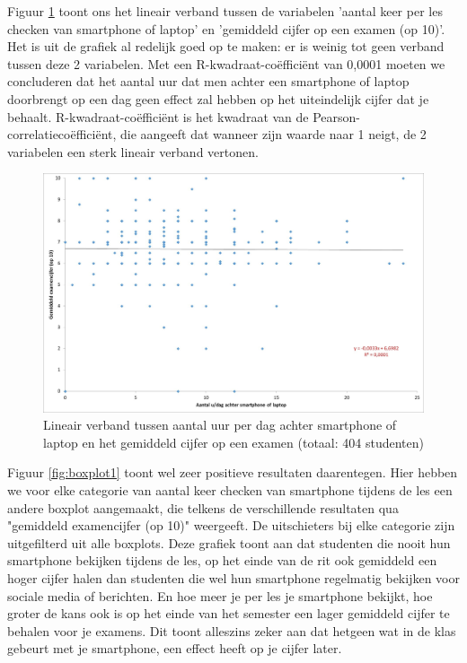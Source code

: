 Figuur \ref{fig:scatter1} toont ons het lineair verband tussen de variabelen 'aantal keer per les checken van smartphone of laptop' en 'gemiddeld cijfer op een examen (op 10)'. Het is uit de grafiek al redelijk goed op te maken: er is weinig tot geen verband tussen deze 2 variabelen. Met een R-kwadraat-coëfficiënt van 0,0001 moeten we concluderen dat het aantal uur dat men achter een smartphone of laptop doorbrengt op een dag geen effect zal hebben op het uiteindelijk cijfer dat je behaalt. R-kwadraat-coëfficiënt is het kwadraat van de Pearson-correlatiecoëfficiënt, die aangeeft dat wanneer zijn waarde naar 1 neigt, de 2 variabelen een sterk lineair verband vertonen. 

\begin{figure}
	\includegraphics[width=\textwidth]
	{img/Scatter1.jpg}
	\caption{Lineair verband tussen aantal uur per dag achter smartphone of laptop en het gemiddeld cijfer op een examen (totaal: 404 studenten)}
	\label{fig:scatter1}
\end{figure}

Figuur \ref{fig:boxplot1} toont wel zeer positieve resultaten daarentegen. Hier hebben we voor elke categorie van aantal keer checken van smartphone tijdens de les een andere boxplot aangemaakt, die telkens de verschillende resultaten qua "gemiddeld examencijfer (op 10)" weergeeft. De uitschieters bij elke categorie zijn uitgefilterd uit alle boxplots. Deze grafiek toont aan dat studenten die nooit hun smartphone bekijken tijdens de les, op het einde van de rit ook gemiddeld een hoger cijfer halen dan studenten die wel hun smartphone regelmatig bekijken voor sociale media of berichten. En hoe meer je per les je smartphone bekijkt, hoe groter de kans ook is op het einde van het semester een lager gemiddeld cijfer te behalen voor je examens. Dit toont alleszins zeker aan dat hetgeen wat in de klas gebeurt met je smartphone, een effect heeft op je cijfer later.

